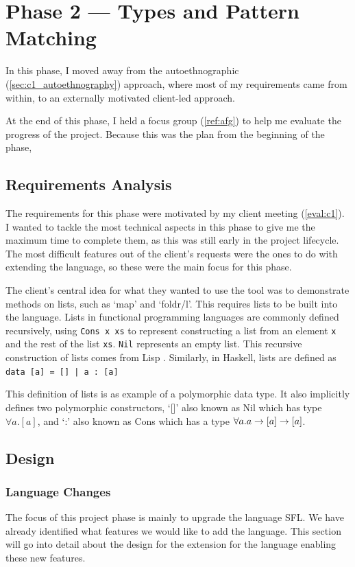 \chapter{Phase 2 --- Types and Pattern Matching}
In this phase, I moved away from the autoethnographic (\ref{sec:c1_autoethnography}) approach, where most of my requirements came from within, to an externally motivated client-led approach. 

At the end of this phase, I held a focus group (\ref{ref:afg}) to help me evaluate the progress of the project. Because this was the plan from the beginning of the phase, 

\section{Requirements Analysis}
The requirements for this phase were motivated by my client meeting (\ref{eval:c1}). I wanted to tackle the most technical aspects in this phase to give me the maximum time to complete them, as this was still early in the project lifecycle. The most difficult features out of the client's requests were the ones to do with extending the language, so these were the main focus for this phase. 

The client's central idea for what they wanted to use the tool was to demonstrate methods on lists, such as `map' and `foldr/l'. This requires lists to be built into the language. Lists in functional programming languages are commonly defined recursively, using \verb|Cons x xs| to represent constructing a list from an element \verb|x| and the rest of the list \verb|xs|. \verb|Nil| represents an empty list. This recursive construction of lists comes from Lisp \cite{mccarthy1960recursivelisp}. Similarly, in Haskell, lists are defined as \verb!data [a] = [] | a : [a]! \\ 

This definition of lists is as example of a polymorphic data type. It also implicitly defines two polymorphic constructors, `[]' also known as Nil which has type $\forall a. [a]$, and `:' also known as Cons which has a type $\forall a. a \rightarrow [a] \rightarrow [a]$. 

\section{Design}
\subsection{Language Changes}
The focus of this project phase is mainly to upgrade the language SFL. We have already identified what features we would like to add the language. This section will go into detail about the design for the extension for the language enabling these new features. 
